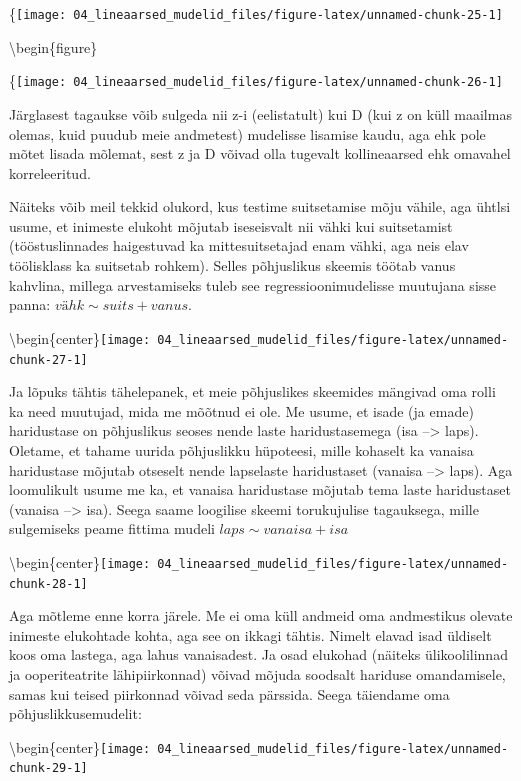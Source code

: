 \documentclass[]{book}
\begin{document}
\{\centering \texttt{[image: 04\_lineaarsed\_mudelid\_files/figure-latex/unnamed-chunk-25-1]}

\textbackslash{}begin\{figure\}

\{\centering \texttt{[image: 04\_lineaarsed\_mudelid\_files/figure-latex/unnamed-chunk-26-1]}

Järglasest tagaukse võib sulgeda nii z-i (eelistatult) kui D (kui z on küll maailmas olemas, kuid puudub meie andmetest) mudelisse lisamise kaudu, aga ehk pole mõtet lisada mõlemat, sest z ja D võivad olla tugevalt kollineaarsed ehk omavahel korreleeritud.

Näiteks võib meil tekkid olukord, kus testime suitsetamise mõju vähile, aga ühtlsi usume, et inimeste elukoht mõjutab iseseisvalt nii vähki kui suitsetamist (tööstuslinnades haigestuvad ka mittesuitsetajad enam vähki, aga neis elav töölisklass ka suitsetab rohkem). Selles põhjuslikus skeemis töötab vanus kahvlina, millega arvestamiseks tuleb see regressioonimudelisse muutujana sisse panna: \(vähk \sim suits + vanus\).

\textbackslash{}begin\{center\}\texttt{[image: 04\_lineaarsed\_mudelid\_files/figure-latex/unnamed-chunk-27-1]}

Ja lõpuks tähtis tähelepanek, et meie põhjuslikes skeemides mängivad oma rolli ka need muutujad, mida me mõõtnud ei ole. Me usume, et isade (ja emade) haridustase on põhjuslikus seoses nende laste haridustasemega (isa --\textgreater{} laps). Oletame, et tahame uurida põhjuslikku hüpoteesi, mille kohaselt ka vanaisa haridustase mõjutab otseselt nende lapselaste haridustaset (vanaisa --\textgreater{} laps). Aga loomulikult usume me ka, et vanaisa haridustase mõjutab tema laste haridustaset (vanaisa --\textgreater{} isa). Seega saame loogilise skeemi torukujulise tagauksega, mille sulgemiseks peame fittima mudeli \(laps \sim vanaisa + isa\)

\textbackslash{}begin\{center\}\texttt{[image: 04\_lineaarsed\_mudelid\_files/figure-latex/unnamed-chunk-28-1]}

Aga mõtleme enne korra järele. Me ei oma küll andmeid oma andmestikus olevate inimeste elukohtade kohta, aga see on ikkagi tähtis. Nimelt elavad isad üldiselt koos oma lastega, aga lahus vanaisadest. Ja osad elukohad (näiteks ülikoolilinnad ja ooperiteatrite lähipiirkonnad) võivad mõjuda soodsalt hariduse omandamisele, samas kui teised piirkonnad võivad seda pärssida. Seega täiendame oma põhjuslikkusemudelit:

\textbackslash{}begin\{center\}\texttt{[image: 04\_lineaarsed\_mudelid\_files/figure-latex/unnamed-chunk-29-1]}
\end{document}
